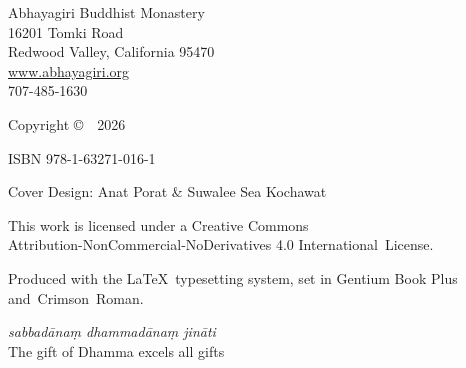
\cleartoverso
\thispagestyle{copyright}

{\copyrightsize
\centering
\setlength{\parindent}{0pt}%
\setlength{\parskip}{0.8\baselineskip}%


Abhayagiri Buddhist Monastery\\
16201 Tomki Road\\
Redwood Valley, California 95470\\
\href{http://www.abhayagiri.org}{www.abhayagiri.org}\\
707-485-1630

\vspace{1\baselineskip}

Copyright \copyright\ \thePublisher\ 2026

ISBN 978-1-63271-016-1

Cover Design: Anat Porat \& Suwalee Sea Kochawat


\vfill

{\footnotesize


This work is licensed under a Creative Commons\\
Attribution-NonCommercial-NoDerivatives 4.0 International~License.


Produced with the \LaTeX\ typesetting system, set in Gentium Book Plus \mbox{and Crimson Roman.}

\theEditionInfo

\vspace{1\baselineskip}

\emph{sabbadānaṃ dhammadānaṃ jināti}\\
The gift of Dhamma excels all gifts

}}